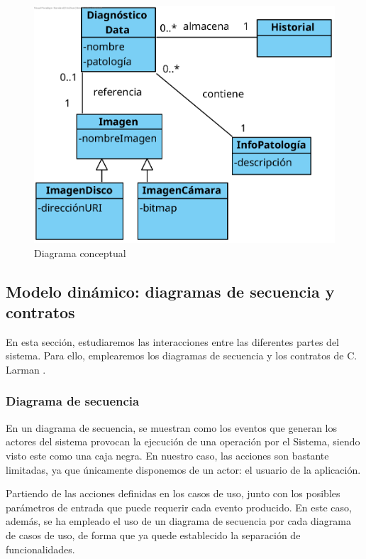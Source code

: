\begin{figure}[H]
	\centering
	\includegraphics[scale = 1.2]{imagenes/MapaConceptual.png}
	\caption{Diagrama conceptual}
	\label{fig:conceptual}
\end{figure}

\subsection{Modelo dinámico: diagramas de secuencia y contratos}

En esta sección, estudiaremos las interacciones entre las diferentes partes del sistema. Para ello, emplearemos los diagramas de secuencia y los contratos de C. Larman \cite{larman2003uml}.

\subsubsection{Diagrama de secuencia}
En un diagrama de secuencia, se muestran como los eventos que generan los actores del sistema provocan la ejecución de una operación por el Sistema, siendo visto este como una caja negra. En nuestro caso, las acciones son bastante limitadas, ya que únicamente disponemos de un actor: el usuario de la aplicación. 

Partiendo de las acciones definidas en los casos de uso, junto con los posibles parámetros de entrada que puede requerir cada evento producido. En este caso, además, se ha empleado el uso de un diagrama de secuencia por cada diagrama de casos de uso, de forma que ya quede establecido la separación de funcionalidades.

